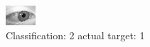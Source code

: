 \begin{figure}[h!]
\begin{center}
\includegraphics[width=0.60\columnwidth]{figures/ID2722_class_2_target_1.png}
\end{center}
\caption{ Classification: 2 actual target: 1}
\label{fig:ID2722_class_2_target_1}
\end{figure}
